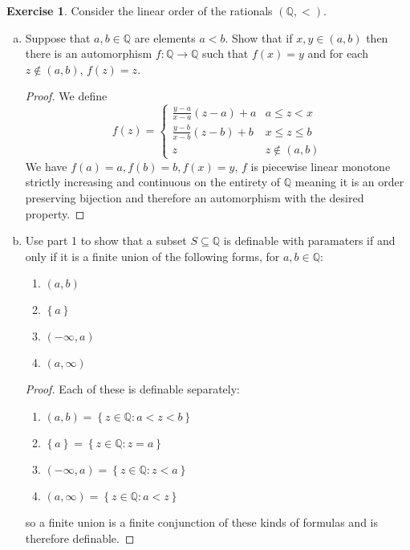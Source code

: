 \documentclass{article}
\newcommand{\Q}{\mathbb{Q}}
\newcommand{\set}[1]{\left\{#1\right\}}
\newcommand{\setwith}[2]{\left\{#1:#2\right\}}
\theoremstyle{definition}
\newtheorem{question}{Exercise}
\begin{document}
\begin{question}
    Consider the linear order of the rationals \((\Q,<)\).

    \begin{enumerate}[(a)]
        \item Suppose that \(a,b\in\Q\) are elements \(a<b\). Show that if
              \(x,y\in(a,b)\) then there is an automorphism \(f:\Q\to\Q\) such that
              \(f(x)=y\) and for each \(z\notin(a,b)\), \(f(z)=z\).

              \begin{proof}
                  We define
                  \[
                      f(z)=\begin{cases}
                          \frac{y-a}{x-a}(z-a)+a & a\leq z<x     \\
                          \frac{y-b}{x-b}(z-b)+b & x\leq z\leq b \\
                          z                      & z\notin(a,b)
                      \end{cases}
                  \]
                  We have \(f(a)=a,f(b)=b,f(x)=y\), \(f\) is piecewise linear
                  monotone strictly increasing and continuous on the entirety of
                  \(\Q\) meaning it is an order preserving bijection and
                  therefore an automorphism with the desired property.
              \end{proof}

        \item Use part 1 to show that a subset \(S\subseteq\Q\) is definable
              with paramaters if and only if it is a finite union of the
              following forms, for \(a,b\in\Q\):
              \begin{enumerate}[1.]
                  \item \((a,b)\)
                  \item \(\set{a}\)
                  \item \((-\infty,a)\)
                  \item \((a,\infty)\)
              \end{enumerate}

              \begin{proof}
                  Each of these is definable separately:
                  \begin{enumerate}[1.]
                      \item \((a,b)=\setwith{z\in\Q}{a<z<b}\)
                      \item \(\set{a}=\setwith{z\in\Q}{z=a}\)
                      \item \((-\infty,a)=\setwith{z\in\Q}{z<a}\)
                      \item \((a,\infty)=\setwith{z\in\Q}{a<z}\)
                  \end{enumerate}
                  so a finite union is a finite conjunction of these kinds of
                  formulas and is therefore definable.


\end{proof}
\end{enumerate}
\end{question}
\end{document}
